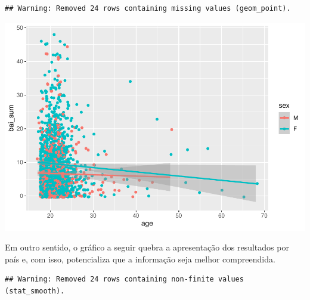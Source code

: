 \documentclass[
]{book}
\newenvironment{Shaded}{\begin{snugshade}}{\end{snugshade}}
\newcommand{\DataTypeTok}[1]{\textcolor[rgb]{0.13,0.29,0.53}{#1}}
\newcommand{\KeywordTok}[1]{\textcolor[rgb]{0.13,0.29,0.53}{\textbf{#1}}}
\newcommand{\NormalTok}[1]{#1}
\newcommand{\OperatorTok}[1]{\textcolor[rgb]{0.81,0.36,0.00}{\textbf{#1}}}
\newcommand{\StringTok}[1]{\textcolor[rgb]{0.31,0.60,0.02}{#1}}
\begin{document}
\begin{verbatim}
## Warning: Removed 24 rows containing missing values (geom_point).
\end{verbatim}

\includegraphics{gitbook-demo_files/figure-latex/unnamed-chunk-26-1.pdf}

Em outro sentido, o gráfico a seguir quebra a apresentação dos resultados por país e, com isso, potencializa que a informação seja melhor compreendida.

\begin{Shaded}
\end{Shaded}

\begin{verbatim}
## Warning: Removed 24 rows containing non-finite values (stat_smooth).
\end{verbatim}
\end{document}
